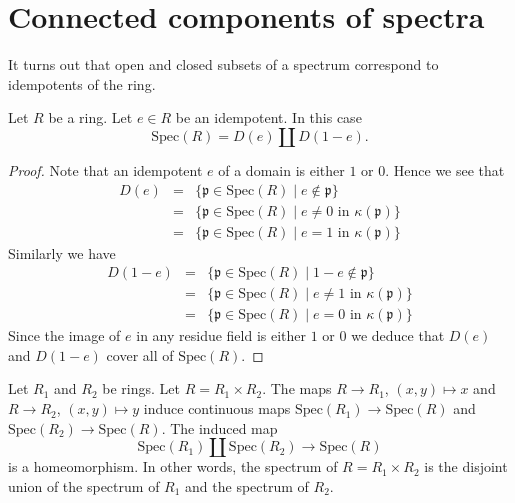 \section{Connected components of spectra}
\label{section-connected-components}

\noindent
It turns out that open and closed subsets of a spectrum correspond to
idempotents of the ring.

\begin{lemma}
\label{lemma-idempotent-spec}
Let $R$ be a ring. Let $e \in R$ be an idempotent.
In this case
$$
\text{Spec}(R) = D(e) \coprod D(1-e).
$$
\end{lemma}

\begin{proof}
Note that an idempotent $e$ of a domain is either $1$ or $0$.
Hence we see that
\begin{eqnarray*}
D(e)
& = &
\{ \mathfrak p \in \text{Spec}(R)
\mid
e \not\in \mathfrak p \} \\
& = &
\{ \mathfrak p \in \text{Spec}(R)
\mid
e \not= 0\text{ in }\kappa(\mathfrak p) \} \\
& = &
\{ \mathfrak p \in \text{Spec}(R)
\mid
e = 1\text{ in }\kappa(\mathfrak p) \}
\end{eqnarray*}
Similarly we have
\begin{eqnarray*}
D(1-e)
& = &
\{ \mathfrak p \in \text{Spec}(R)
\mid
1 - e \not\in \mathfrak p \} \\
& = &
\{ \mathfrak p \in \text{Spec}(R)
\mid
e \not= 1\text{ in }\kappa(\mathfrak p) \} \\
& = &
\{ \mathfrak p \in \text{Spec}(R)
\mid
e = 0\text{ in }\kappa(\mathfrak p) \}
\end{eqnarray*}
Since the image of $e$ in any residue field is either $1$ or $0$
we deduce that $D(e)$ and $D(1-e)$ cover all of $\text{Spec}(R)$.
\end{proof}

\begin{lemma}
\label{lemma-spec-product}
Let $R_1$ and $R_2$ be rings.
Let $R = R_1 \times R_2$. 
The maps $R \to R_1$, $(x,y) \mapsto x$ and $R \to R_2$,
$(x,y) \mapsto y$
induce continuous maps $\text{Spec}(R_1) \to \text{Spec}(R)$ and
$\text{Spec}(R_2) \to \text{Spec}(R)$.
The induced map
$$
\text{Spec}(R_1) \coprod \text{Spec}(R_2) 
\longrightarrow
\text{Spec}(R)
$$
is a homeomorphism. In other words,
the spectrum of $R = R_1\times R_2$ is the
disjoint union of the spectrum of $R_1$ and the
spectrum of $R_2$.
\end{lemma}

